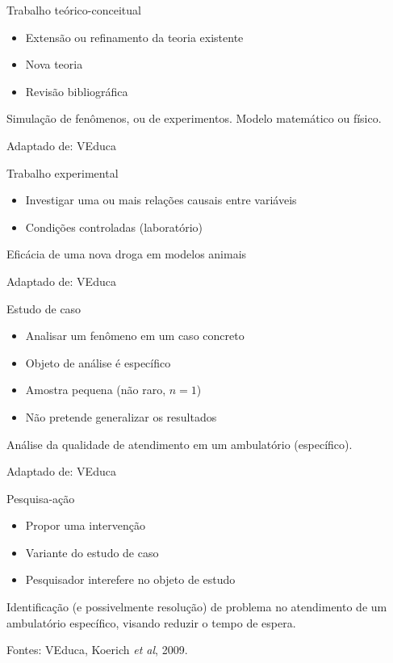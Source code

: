 \documentclass{beamer}
\begin{document}
\begin{frame}{Trabalho teórico-conceitual}
  \begin{itemize}
  \item Extensão ou refinamento da teoria existente
  \item Nova teoria
  \item Revisão bibliográfica
  \end{itemize}
  \begin{example}
    Simulação de fenômenos, ou de experimentos. Modelo matemático ou físico.
  \end{example}
  Adaptado de: VEduca
\end{frame}

\begin{frame}{Trabalho experimental}
  \begin{itemize}
  \item Investigar uma ou mais relações causais entre variáveis
  \item Condições controladas (laboratório)
  \end{itemize}
  \begin{example}
    Eficácia de uma nova droga em modelos animais
  \end{example}
  Adaptado de: VEduca
\end{frame}

\begin{frame}{Estudo de caso}
  \begin{itemize}
  \item Analisar um fenômeno em um caso concreto
  \item Objeto de análise é específico
  \item Amostra pequena (não raro, $n=1$)
  \item Não pretende generalizar os resultados
  \end{itemize}
  \begin{example}
    Análise da qualidade de atendimento em um ambulatório (específico).
  \end{example}
  Adaptado de: VEduca
\end{frame}

\begin{frame}{Pesquisa-ação}
  \begin{itemize}
  \item Propor uma \alert{intervenção}
  \item Variante do estudo de caso
  \item Pesquisador interefere no objeto de estudo
  \end{itemize}
  \begin{example}
    Identificação (e possivelmente resolução) de problema no
    atendimento de um ambulatório específico, visando reduzir o tempo
    de espera.
  \end{example}
  Fontes: VEduca, Koerich {\em et al}, 2009.
\end{frame}
\end{document}
